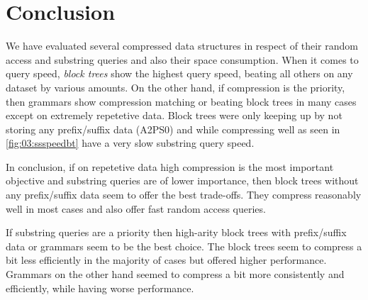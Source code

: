 \documentclass{scrartcl}
\begin{document}
\section{Conclusion}

We have evaluated several compressed data structures in respect of their random access and substring queries and also their space consumption.
When it comes to query speed, \emph{block trees} show the highest query speed, beating all others on any dataset by various amounts.
On the other hand, if compression is the priority, then grammars show compression matching or beating block trees in many cases except on extremely repetetive data.
Block trees were only keeping up by not storing any prefix/suffix data (A2PS0) and while compressing well as seen in \cref{fig:03:ssspeedbt} have a very slow substring query speed.

In conclusion, if on repetetive data high compression is the most important objective and substring queries are of lower importance,
then block trees without any prefix/suffix data seem to offer the best trade-offs.
They compress reasonably well in most cases and also offer fast random access queries.

If substring queries are a priority then high-arity block trees with prefix/suffix data or grammars seem to be the best choice.
The block trees seem to compress a bit less efficiently in the majority of cases but offered higher performance.
Grammars on the other hand seemed to compress a bit more consistently and efficiently, while having worse performance.


\end{document}
